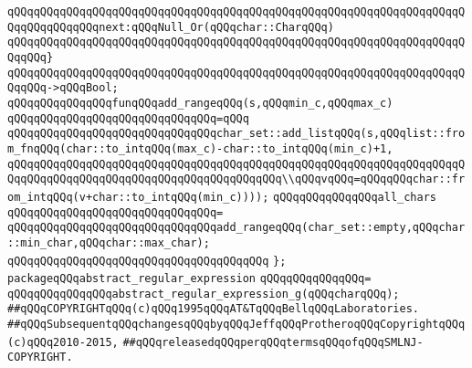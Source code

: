\verb|qQQqqQQqqQQqqQQqqQQqqQQqqQQqqQQqqQQqqQQqqQQqqQQqqQQqqQQqqQQqqQQqqQQqqQQqqQQqqQQqqQQqnext:qQQqNull_Or(qQQqchar::CharqQQq)|\newline
\verb|qQQqqQQqqQQqqQQqqQQqqQQqqQQqqQQqqQQqqQQqqQQqqQQqqQQqqQQqqQQqqQQqqQQqqQQqqQQq}|\newline
\verb|qQQqqQQqqQQqqQQqqQQqqQQqqQQqqQQqqQQqqQQqqQQqqQQqqQQqqQQqqQQqqQQqqQQqqQQqqQQq->qQQqBool;|\newline
\newline
\verb|qQQqqQQqqQQqqQQqfunqQQqadd_rangeqQQq(s,qQQqmin_c,qQQqmax_c)|\newline
\verb|qQQqqQQqqQQqqQQqqQQqqQQqqQQqqQQq=qQQq|\newline
\verb|qQQqqQQqqQQqqQQqqQQqqQQqqQQqqQQqchar_set::add_listqQQq(s,qQQqlist::from_fnqQQq(char::to_intqQQq(max_c)-char::to_intqQQq(min_c)+1,|\newline
\verb|qQQqqQQqqQQqqQQqqQQqqQQqqQQqqQQqqQQqqQQqqQQqqQQqqQQqqQQqqQQqqQQqqQQqqQQqqQQqqQQqqQQqqQQqqQQqqQQqqQQqqQQqqQQqqQQq\\qQQqvqQQq=qQQqqQQqchar::from_intqQQq(v+char::to_intqQQq(min_c))));|\newline
\newline
\verb|qQQqqQQqqQQqqQQqall_chars|\newline
\verb|qQQqqQQqqQQqqQQqqQQqqQQqqQQqqQQq=|\newline
\verb|qQQqqQQqqQQqqQQqqQQqqQQqqQQqqQQqadd_rangeqQQq(char_set::empty,qQQqchar::min_char,qQQqchar::max_char);|\newline
\verb|qQQqqQQqqQQqqQQqqQQqqQQqqQQqqQQqqQQqqQQq|\newline
\verb|};|\newline
\newline
\verb|packageqQQqabstract_regular_expression|\newline
\verb|qQQqqQQqqQQqqQQq=|\newline
\verb|qQQqqQQqqQQqqQQqabstract_regular_expression_g(qQQqcharqQQq);|\newline
\newline
\newline
\verb|##qQQqCOPYRIGHTqQQq(c)qQQq1995qQQqAT&TqQQqBellqQQqLaboratories.|\newline
\verb|##qQQqSubsequentqQQqchangesqQQqbyqQQqJeffqQQqProtheroqQQqCopyrightqQQq(c)qQQq2010-2015,|\newline
\verb|##qQQqreleasedqQQqperqQQqtermsqQQqofqQQqSMLNJ-COPYRIGHT.|\newline

